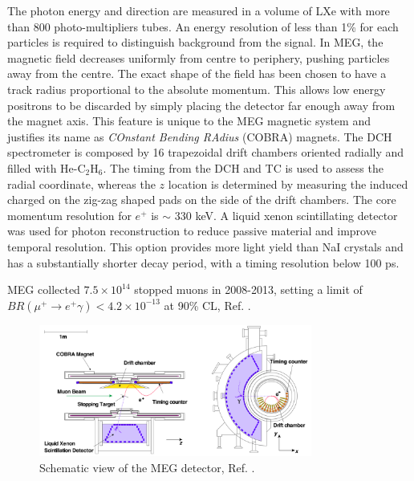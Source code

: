 The photon energy and direction are measured in a volume of LXe with more than 800 photo-multipliers tubes. 
An energy resolution of less than 1\% for each particles is required to distinguish background from the signal. 
In MEG, the magnetic field decreases uniformly from centre to periphery, pushing particles away from the centre. 
The exact shape of the field has been chosen to have a track radius proportional to the absolute momentum.
This allows low energy positrons to be discarded by simply placing the detector far enough away from the magnet axis. 
This feature is unique to the MEG magnetic system and justifies its name as \textit{COnstant Bending RAdius} (COBRA) magnets.
The DCH spectrometer is composed by 16 trapezoidal drift chambers oriented radially and filled with He-C$_2$H$_6$. 
The timing from the DCH and TC is used to assess the radial coordinate, whereas the $z$ location is determined by measuring the induced
charged on the zig-zag shaped pads on the side of the drift chambers. The core momentum resolution for $e^+$ is $\sim$ 330 keV.
A liquid xenon scintillating detector was used for photon reconstruction to reduce passive material and improve temporal resolution. 
This option provides more light yield than NaI crystals 
and has a substantially shorter decay period, with a timing resolution below 100 ps.

MEG collected $7.5 \times 10^{14}$ stopped muons in 2008-2013, 
setting a limit of $BR(\mu^+ \rightarrow e^+ \gamma) < 4.2 \times 10^{-13}$ at 90\% CL, Ref. \cite{megi}.
\begin{figure}[!h]
\centering
\includegraphics[width =0.8\textwidth]{figures/png/Screenshot_20240321_115127.png}
\caption[MEG detector.]{Schematic view of the MEG detector, Ref. \cite{megi}.}
\label{fig:meg}
\end{figure}
